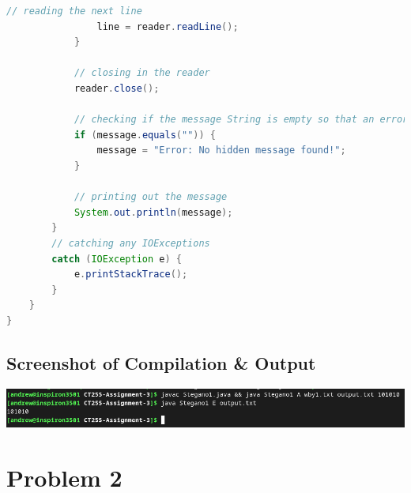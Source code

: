 \documentclass[a4paper]{article}
\begin{document}
\begin{lstlisting}[language=Java]
                // reading the next line
	        	line = reader.readLine();
            }

            // closing in the reader
            reader.close();

            // checking if the message String is empty so that an error message can be printed if no hidden message was found
            if (message.equals("")) {
                message = "Error: No hidden message found!";
            }

            // printing out the message
            System.out.println(message);
	    } 
        // catching any IOExceptions
        catch (IOException e) {
	        e.printStackTrace();
	    }
    }
}
\end{lstlisting}

\subsection{Screenshot of Compilation \& Output}
\includegraphics[width = 15cm]{output1.png}
\bigskip


\section{Problem 2}
\end{document}
